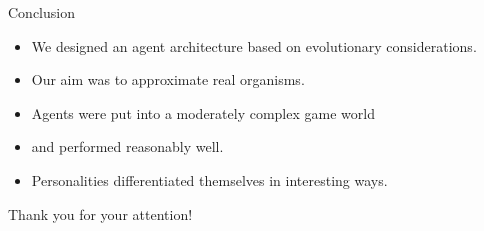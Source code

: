 \documentclass{beamer}
\begin{document}
   \begin{frame}{Conclusion}
      \begin{itemize}
         \item We designed an agent architecture based on evolutionary considerations.
         \pause
         \item Our aim was to approximate real organisms.
         \pause
         \item Agents were put into a moderately complex game world
         \pause
         \item and performed reasonably well.
         \pause
         \item Personalities differentiated themselves in interesting ways.
      \end{itemize}
   \end{frame}
   
   \begin{frame}[plain, c]
      \begin{center}
         \huge Thank you for your attention!
      \end{center}
   \end{frame}
   
%      
%      
%      
%      
%      
   
\end{document}
